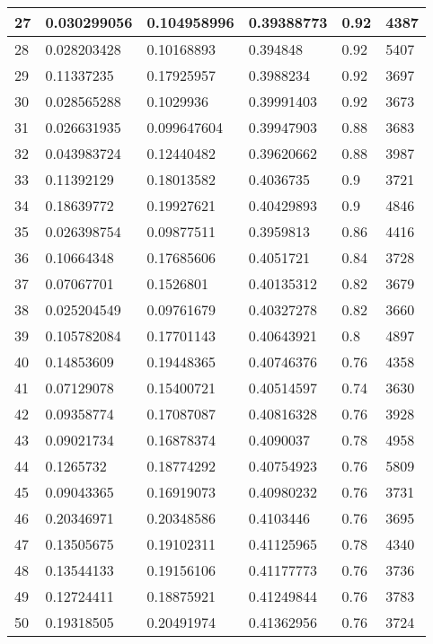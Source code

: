 \begin{longtable}{|l|l|l|l|l|l|}
27 & 0.030299056 & 0.104958996 & 0.39388773 & 0.92 & 4387 \\ \hline 
28 & 0.028203428 & 0.10168893 & 0.394848 & 0.92 & 5407 \\ \hline 
29 & 0.11337235 & 0.17925957 & 0.3988234 & 0.92 & 3697 \\ \hline 
30 & 0.028565288 & 0.1029936 & 0.39991403 & 0.92 & 3673 \\ \hline 
31 & 0.026631935 & 0.099647604 & 0.39947903 & 0.88 & 3683 \\ \hline 
32 & 0.043983724 & 0.12440482 & 0.39620662 & 0.88 & 3987 \\ \hline 
33 & 0.11392129 & 0.18013582 & 0.4036735 & 0.9 & 3721 \\ \hline 
34 & 0.18639772 & 0.19927621 & 0.40429893 & 0.9 & 4846 \\ \hline 
35 & 0.026398754 & 0.09877511 & 0.3959813 & 0.86 & 4416 \\ \hline 
36 & 0.10664348 & 0.17685606 & 0.4051721 & 0.84 & 3728 \\ \hline 
37 & 0.07067701 & 0.1526801 & 0.40135312 & 0.82 & 3679 \\ \hline 
38 & 0.025204549 & 0.09761679 & 0.40327278 & 0.82 & 3660 \\ \hline 
39 & 0.105782084 & 0.17701143 & 0.40643921 & 0.8 & 4897 \\ \hline 
40 & 0.14853609 & 0.19448365 & 0.40746376 & 0.76 & 4358 \\ \hline 
41 & 0.07129078 & 0.15400721 & 0.40514597 & 0.74 & 3630 \\ \hline 
42 & 0.09358774 & 0.17087087 & 0.40816328 & 0.76 & 3928 \\ \hline 
43 & 0.09021734 & 0.16878374 & 0.4090037 & 0.78 & 4958 \\ \hline 
44 & 0.1265732 & 0.18774292 & 0.40754923 & 0.76 & 5809 \\ \hline 
45 & 0.09043365 & 0.16919073 & 0.40980232 & 0.76 & 3731 \\ \hline 
46 & 0.20346971 & 0.20348586 & 0.4103446 & 0.76 & 3695 \\ \hline 
47 & 0.13505675 & 0.19102311 & 0.41125965 & 0.78 & 4340 \\ \hline 
48 & 0.13544133 & 0.19156106 & 0.41177773 & 0.76 & 3736 \\ \hline 
49 & 0.12724411 & 0.18875921 & 0.41249844 & 0.76 & 3783 \\ \hline 
50 & 0.19318505 & 0.20491974 & 0.41362956 & 0.76 & 3724 \\ \hline 
\end{longtable}